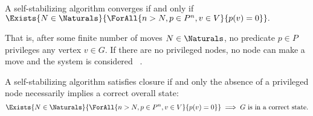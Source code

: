 A self-stabilizing algorithm converges if and only if $\Exists{N \in \Naturals}{\ForAll{n > N, p \in P^n, v \in V}{p(v) = 0}}.$
\begin{comment}
  \label{eq:define-ssalg:converge}
  \Exists{N \in \Naturals}{\ForAll{n > N, p \in P^n, v \in V}{p(v) = 0}}.
\end{comment}
That is, after some finite number of moves $N \in \Naturals$,
  no predicate $p \in P$ privileges any vertex $v \in G$.
If there are no privileged nodes, no node can make a move and
  the system is considered ~\autocite{dew:sem}.

A self-stabilizing algorithm satisfies closure if and only
  the absence of a privileged node necessarily implies a correct overall state:
\begin{equation}
  \label{eq:define-ssalg:closure}
  \Exists{N \in \Naturals}{\ForAll{n > N, p \in P^n, v \in V}{p(v) = 0}}
  \implies \text{$G$ is in a correct state}.
\end{equation}

